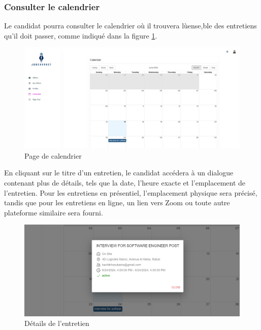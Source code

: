 \subsubsection{Consulter le calendrier}

Le candidat pourra consulter le calendrier où il trouvera lùense,ble des entretiens qu'il doit passer, comme indiqué dans la figure \ref{fig:calendrierCandid}. 
\begin{figure}[htbp]
   \centering
   \includegraphics[scale=0.18]{screens/calendarCand.png} 
   \caption{Page de calendrier}
   \label{fig:calendrierCandid}
\end{figure}


En cliquant sur le titre d'un entretien, le candidat accédera à un dialogue contenant plus de détails, tels que la date, l'heure exacte 
et l'emplacement de l'entretien. Pour les entretiens en présentiel, l'emplacement physique sera précisé, tandis que pour les entretiens en ligne, 
un lien vers Zoom ou toute autre plateforme similaire sera fourni.
\begin{figure}[htbp]
   \centering
   \includegraphics[scale=0.3]{screens/detail interview.png} 
   \caption{Détails de l'entretien}
   \label{fig:listOffers}
\end{figure}

